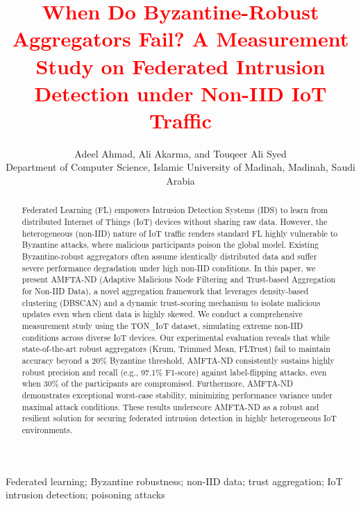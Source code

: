 \documentclass[journal]{IEEEtran}
\begin{document}
\title{\textcolor{red}{When Do Byzantine-Robust Aggregators Fail? A Measurement Study on Federated Intrusion Detection under Non-IID IoT Traffic}}

\author{Adeel Ahmad, Ali Akarma, and Touqeer Ali Syed\\Department of Computer Science, Islamic University of Madinah, Madinah, Saudi Arabia}

\maketitle

\begin{abstract}
\color{blue}
Federated Learning (FL) empowers Intrusion Detection Systems (IDS) to learn from distributed Internet of Things (IoT) devices without sharing raw data. However, the heterogeneous (non-IID) nature of IoT traffic renders standard FL highly vulnerable to Byzantine attacks, where malicious participants poison the global model. Existing Byzantine-robust aggregators often assume identically distributed data and suffer severe performance degradation under high non-IID conditions. In this paper, we present AMFTA-ND (Adaptive Malicious Node Filtering and Trust-based Aggregation for Non-IID Data), a novel aggregation framework that leverages density-based clustering (DBSCAN) and a dynamic trust-scoring mechanism to isolate malicious updates even when client data is highly skewed. We conduct a comprehensive measurement study using the TON\_IoT dataset, simulating extreme non-IID conditions across diverse IoT devices. Our experimental evaluation reveals that while state-of-the-art robust aggregators (Krum, Trimmed Mean, FLTrust) fail to maintain accuracy beyond a 20\% Byzantine threshold, AMFTA-ND consistently sustains highly robust precision and recall (e.g., 97.1\% F1-score) against label-flipping attacks, even when 30\% of the participants are compromised. Furthermore, AMFTA-ND demonstrates exceptional worst-case stability, minimizing performance variance under maximal attack conditions. These results underscore AMFTA-ND as a robust and resilient solution for securing federated intrusion detection in highly heterogeneous IoT environments.
\end{abstract}

\begin{IEEEkeywords}
Federated learning; Byzantine robustness; non-IID data; trust aggregation;
IoT intrusion detection; poisoning attacks
\end{IEEEkeywords}
\end{document}
